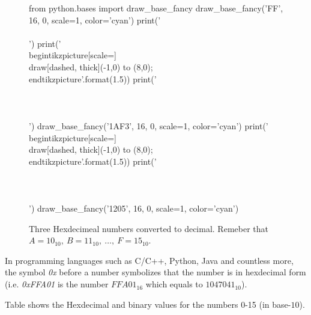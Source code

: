 \begin{figure}
  \centering
  \begin{pycode}
from python.bases import draw_base_fancy
draw_base_fancy('FF', 16, 0, scale=1, color='cyan')
print('\\\\')
print('\\begin{{tikzpicture}}[scale={}] \\draw[dashed, thick](-1,0) to (8,0); \\end{{tikzpicture}}'.format(1.5))
print('\\\\~\\\\')
draw_base_fancy('1AF3', 16, 0, scale=1, color='cyan')
print('\\begin{{tikzpicture}}[scale={}] \\draw[dashed, thick](-1,0) to (8,0); \\end{{tikzpicture}}'.format(1.5))
print('\\\\~\\\\')
draw_base_fancy('1205', 16, 0, scale=1, color='cyan')
  \end{pycode}
  \label{fig:num_base16}
  \caption[Hex numbers]{Three Hexdecimeal numbers converted to decimal. Remeber that $A=10_{10},\ B=11_{10},\ \dots,\ F=15_{10}$.}
\end{figure} 

In programming languages such as C/C++, Python, Java and countless more, the symbol \textit{0x} before a number symbolizes that the number is in hexdecimal form (i.e. \textit{0xFFA01} is the number $FFA01_{16}$ which equals to $1047041_{10}$). \par

Table  shows the Hexdecimal and binary values for the numbers 0-15 (in base-$10$).

